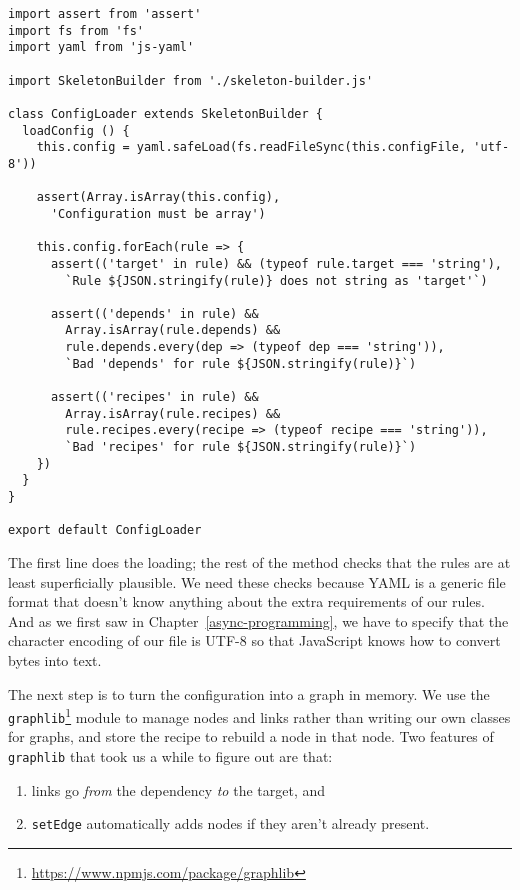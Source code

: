 \documentclass[krantzl]{krantz}
\newcommand{\chapref}[1]{Chapter~\ref{#1}}
\newcommand{\hreffoot}[2]{{#1}\footnote{\href{#2}{#2}}}
\begin{document}
\begin{lstlisting}[frame=single,frameround=tttt]
import assert from 'assert'
import fs from 'fs'
import yaml from 'js-yaml'

import SkeletonBuilder from './skeleton-builder.js'

class ConfigLoader extends SkeletonBuilder {
  loadConfig () {
    this.config = yaml.safeLoad(fs.readFileSync(this.configFile, 'utf-8'))

    assert(Array.isArray(this.config),
      'Configuration must be array')

    this.config.forEach(rule => {
      assert(('target' in rule) && (typeof rule.target === 'string'),
        `Rule ${JSON.stringify(rule)} does not string as 'target'`)

      assert(('depends' in rule) &&
        Array.isArray(rule.depends) &&
        rule.depends.every(dep => (typeof dep === 'string')),
        `Bad 'depends' for rule ${JSON.stringify(rule)}`)

      assert(('recipes' in rule) &&
        Array.isArray(rule.recipes) &&
        rule.recipes.every(recipe => (typeof recipe === 'string')),
        `Bad 'recipes' for rule ${JSON.stringify(rule)}`)
    })
  }
}

export default ConfigLoader
\end{lstlisting}



\noindent The first line does the loading;
the rest of the method checks that the rules are at least superficially plausible.
We need these checks because YAML is a generic file format
that doesn't know anything about the extra requirements of our rules.
And as we first saw in \chapref{async-programming},
we have to specify that the character encoding of our file is UTF-8
so that JavaScript knows how to convert bytes into text.


The next step is to turn the configuration into a graph in memory.
We use the \hreffoot{\texttt{graphlib}}{https://www.npmjs.com/package/graphlib} module to manage nodes and links
rather than writing our own classes for graphs,
and store the recipe to rebuild a node in that node.
Two features of \texttt{graphlib} that took us a while to figure out are that:

\begin{enumerate}

\item 

links go \emph{from} the dependency \emph{to} the target,
    and



\item 

\texttt{setEdge} automatically adds nodes if they aren't already present.



\end{enumerate}
\end{document}
